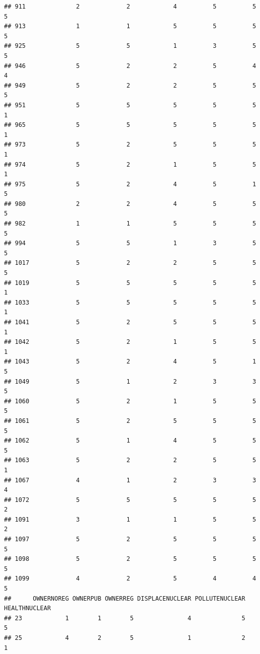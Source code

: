 \documentclass[
]{article}
\begin{document}
\begin{verbatim}
## 911              2             2            4          5          5        5
## 913              1             1            5          5          5        5
## 925              5             5            1          3          5        5
## 946              5             2            2          5          4        4
## 949              5             2            2          5          5        5
## 951              5             5            5          5          5        1
## 965              5             5            5          5          5        1
## 973              5             2            5          5          5        1
## 974              5             2            1          5          5        1
## 975              5             2            4          5          1        5
## 980              2             2            4          5          5        5
## 982              1             1            5          5          5        5
## 994              5             5            1          3          5        5
## 1017             5             2            2          5          5        5
## 1019             5             5            5          5          5        1
## 1033             5             5            5          5          5        1
## 1041             5             2            5          5          5        1
## 1042             5             2            1          5          5        1
## 1043             5             2            4          5          1        5
## 1049             5             1            2          3          3        5
## 1060             5             2            1          5          5        5
## 1061             5             2            5          5          5        5
## 1062             5             1            4          5          5        5
## 1063             5             2            2          5          5        1
## 1067             4             1            2          3          3        4
## 1072             5             5            5          5          5        2
## 1091             3             1            1          5          5        2
## 1097             5             2            5          5          5        5
## 1098             5             2            5          5          5        5
## 1099             4             2            5          4          4        5
##      OWNERNOREG OWNERPUB OWNERREG DISPLACENUCLEAR POLLUTENUCLEAR HEALTHNUCLEAR
## 23            1        1        5               4              5             5
## 25            4        2        5               1              2             1

\end{verbatim}
\end{document}
